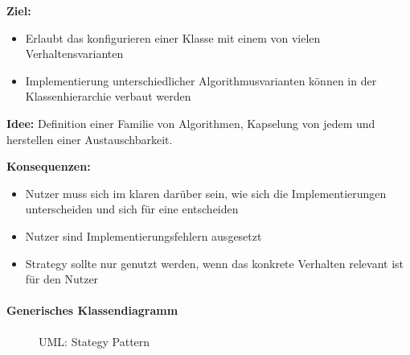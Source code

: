 				\textbf{Ziel:}
					\begin{itemize}
						\item Erlaubt das konfigurieren einer Klasse mit einem von vielen Verhaltensvarianten
						\item Implementierung unterschiedlicher Algorithmusvarianten können in der Klassenhierarchie verbaut werden
					\end{itemize}
				
				\textbf{Idee:} Definition einer Familie von Algorithmen, Kapselung von jedem und herstellen einer Austauschbarkeit.
				
				\textbf{Konsequenzen:}
					\begin{itemize}
						\item Nutzer muss sich im klaren darüber sein, wie sich die Implementierungen unterscheiden und sich für eine entscheiden
						\item Nutzer sind Implementierungsfehlern ausgesetzt
						\item Strategy sollte nur genutzt werden, wenn das konkrete Verhalten relevant ist für den Nutzer
					\end{itemize}
			
			\paragraph{Generisches Klassendiagramm}
				\begin{figure}[ht]
					\centering
					\caption{UML: Stategy Pattern}
				\end{figure}
			
